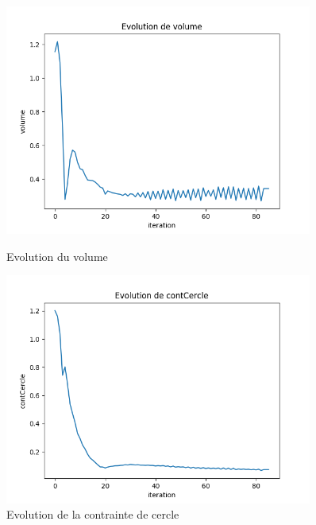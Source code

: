 \documentclass[11pt,a4paper]{article}
\begin{document}
\begin{figure}[H]
	\begin{minipage}{0.48\textwidth}
		\includegraphics[width=0.9\textwidth]{toutNonFixevolume.png}
		\caption{Evolution du volume}
	\end{minipage}
	\begin{minipage}{0.48\textwidth}
		\includegraphics[width=0.9\textwidth]{toutNonFixeContCercle.png}
		\caption{Evolution de la contrainte de cercle}
	\end{minipage}
\end{figure}
\end{document}

